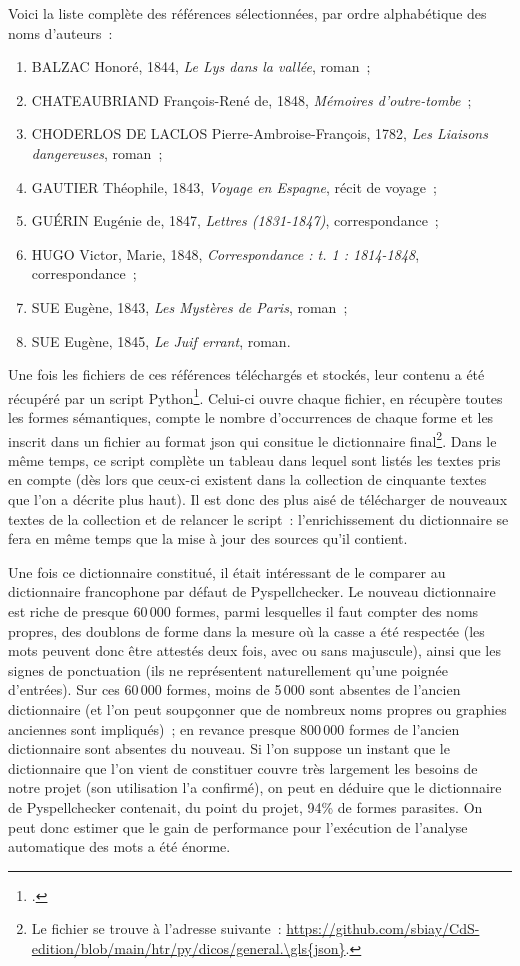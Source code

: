 \documentclass[a4paper,12pt,twoside]{book}
\begin{document}
				Voici la liste complète des références sélectionnées, par ordre alphabétique des noms d'auteurs~:
				\begin{enumerate}
					\item BALZAC Honoré, 1844, \textit{Le Lys dans la vallée}, roman~;
					\item CHATEAUBRIAND François-René de, 1848, \textit{Mémoires d'outre-tombe}~;
					\item CHODERLOS DE LACLOS Pierre-Ambroise-François, 1782, \textit{Les Liaisons dangereuses}, roman~;
					\item GAUTIER Théophile, 1843, \textit{Voyage en Espagne}, récit de voyage~;
					\item GUÉRIN Eugénie de, 1847, \textit{Lettres (1831-1847)}, correspondance~;
					\item HUGO Victor, Marie, 1848, \textit{Correspondance : t. 1 : 1814-1848}, correspondance~;
					\item SUE Eugène, 1843, \textit{Les Mystères de Paris}, roman~;
					\item SUE Eugène, 1845, \textit{Le Juif errant}, roman.
				\end{enumerate}
			
				Une fois les fichiers de ces références téléchargés et stockés, leur contenu a été récupéré par un script Python\footcite{biayDictGenerateurPy2022}. Celui-ci ouvre chaque fichier, en récupère toutes les formes sémantiques, compte le nombre d'occurrences de chaque forme et les inscrit dans un fichier au format \gls{json} qui consitue le dictionnaire final\footnote{Le fichier se trouve à l'adresse suivante~: \url{https://github.com/sbiay/CdS-edition/blob/main/htr/py/dicos/general.\gls{json}}.}.
				Dans le même temps, ce script complète un tableau dans lequel sont listés les textes pris en compte (dès lors que ceux-ci existent dans la collection de cinquante textes que l'on a décrite plus haut). Il est donc des plus aisé de télécharger de nouveaux textes de la collection et de relancer le script~: l'enrichissement du dictionnaire se fera en même temps que la mise à jour des sources qu'il contient.
				
				Une fois ce dictionnaire constitué, il était intéressant de le comparer au dictionnaire francophone par défaut de Pyspellchecker. Le nouveau dictionnaire est riche de presque 60\,000 formes, parmi lesquelles il faut compter des noms propres, des doublons de forme dans la mesure où la casse a été respectée (les mots peuvent donc être attestés deux fois, avec ou sans majuscule), ainsi que les signes de ponctuation (ils ne représentent naturellement qu'une poignée d'entrées).
				Sur ces 60\,000 formes, moins de 5\,000 sont absentes de l'ancien dictionnaire (et l'on peut soupçonner que de nombreux noms propres ou graphies anciennes sont impliqués)~; en revance presque 800\,000 formes de l'ancien dictionnaire sont absentes du nouveau. Si l'on suppose un instant que le dictionnaire que l'on vient de constituer couvre très largement les besoins de notre projet (son utilisation l'a confirmé), on peut en déduire que le dictionnaire de Pyspellchecker contenait, du point du projet, 94\% de formes parasites. On peut donc estimer que le gain de performance pour l'exécution de l'analyse automatique des mots a été énorme.
				
\end{document}
